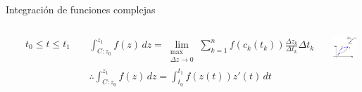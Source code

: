 \documentclass[9pt, aspectratio=169]{beamer}
\begin{document}
\begin{frame}{Integración de funciones complejas}
\begin{columns}[t]
		$\qquad t_0 \leq t \leq t_1$

		\begin{multline*} \int_{C: z_0}^{z_1} f(z) \, dz = \lim_{\substack{\max \\ \Delta z \rightarrow 0}} \sum_{k=1}^n f(c_k(t_k)) \frac{\Delta z_k}{\Delta t_k} \Delta t_k \\
			\therefore \int_{C: z_0}^{z_1} f(z) \, dz = \int_{t_0}^{t_1} f(z(t)) z'(t) \, dt
		\end{multline*}

		\vspace{2em}
		\begin{center}
			\includegraphics[width=0.85\textwidth]{figs/fig-07.pdf}
		\end{center}
	\end{columns}
\end{frame}
\end{document}
